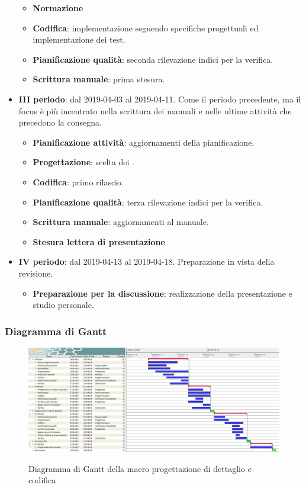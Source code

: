 \begin{itemize}
\begin{itemize}
    	        \item \textbf{Normazione}
    	        \item \textbf{Codifica}: implementazione seguendo specifiche progettuali ed implementazione dei test.
    	        \item \textbf{Pianificazione qualità}: seconda rilevazione indici per la verifica.
    	        \item \textbf{Scrittura manuale}: prima stesura.
        	\end{itemize}
        	\item \textbf{III periodo}: dal 2019-04-03 al 2019-04-11. Come il periodo precedente, ma il focus è più incentrato nella
				scrittura dei manuali e nelle ultime attività che precedono la consegna.
			\begin{itemize}
				\item \textbf{Pianificazione attività}: aggiornamenti della pianificazione.
    	        \item \textbf{Progettazione}: scelta dei .
    	        \item \textbf{Codifica}: primo rilascio.
    	        \item \textbf{Pianificazione qualità}: terza rilevazione indici per la verifica.
    	        \item \textbf{Scrittura manuale}: aggiornamenti al manuale.
    	        \item \textbf{Stesura lettera di presentazione}
        	\end{itemize}
        	\item \textbf{IV periodo}: dal 2019-04-13 al 2019-04-18. Preparazione in vista della revisione.
			\begin{itemize}
				\item \textbf{Preparazione per la discussione}: realizzazione della presentazione e studio personale.
        	\end{itemize}
        \end{itemize}

        \begin{landscape}
			\subsubsection{Diagramma di Gantt}
			\begin{figure}[H]
					\centering
					\includegraphics[scale=0.42]{img/Progettazione_di_dettaglio_e_codifica.png}\\
					\caption{Diagramma di Gantt della macro progettazione di dettaglio e codifica}
			\end{figure}
		\end{landscape}
		\newpage


